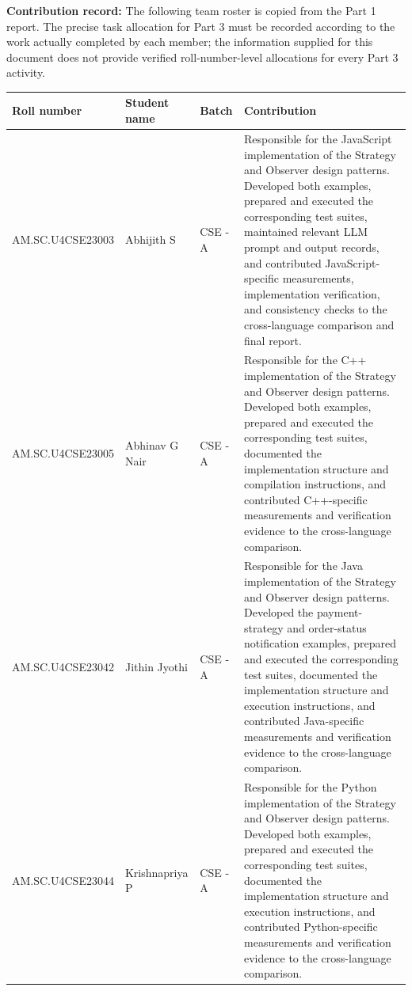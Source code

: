 \documentclass[11pt,a4paper]{article}
\newcommand{\tsmall}{\small\setlength{\tabcolsep}{3pt}}
\begin{document}
\textbf{Contribution record:} The following team roster is copied from the Part 1 report. The precise task allocation for Part 3 must be recorded according to the work actually completed by each member; the information supplied for this document does not provide verified roll-number-level allocations for every Part 3 activity.

\begingroup\tsmall
\begin{longtable}{@{}P{3.0cm}P{2.6cm}P{1.6cm}P{8.9cm}@{}}
\toprule
\textbf{Roll number} & \textbf{Student name} & \textbf{Batch} & \textbf{Contribution}\\
\midrule
\endhead
AM.SC.U4CSE23003 & Abhijith S & CSE - A & Responsible for the JavaScript implementation of the Strategy and Observer design patterns. Developed both examples, prepared and executed the corresponding test suites, maintained relevant LLM prompt and output records, and contributed JavaScript-specific measurements, implementation verification, and consistency checks to the cross-language comparison and final report.\\
AM.SC.U4CSE23005 & Abhinav G Nair & CSE - A & Responsible for the C++ implementation of the Strategy and Observer design patterns. Developed both examples, prepared and executed the corresponding test suites, documented the implementation structure and compilation instructions, and contributed C++-specific measurements and verification evidence to the cross-language comparison.\\
AM.SC.U4CSE23042 & Jithin Jyothi & CSE - A & Responsible for the Java implementation of the Strategy and Observer design patterns. Developed the payment-strategy and order-status notification examples, prepared and executed the corresponding test suites, documented the implementation structure and execution instructions, and contributed Java-specific measurements and verification evidence to the cross-language comparison.\\
AM.SC.U4CSE23044 & Krishnapriya P & CSE - A & Responsible for the Python implementation of the Strategy and Observer design patterns. Developed both examples, prepared and executed the corresponding test suites, documented the implementation structure and execution instructions, and contributed Python-specific measurements and verification evidence to the cross-language comparison.\\
\bottomrule
\end{longtable}
\endgroup
\end{document}
